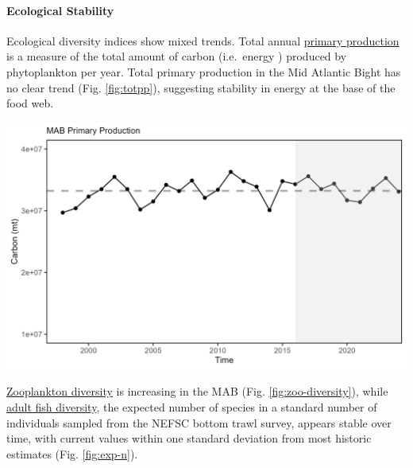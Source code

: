\documentclass[
  10pt,
]{article}
\let\origfigure\figure
\let\endorigfigure\endfigure
\renewenvironment{figure}[1][2] {
    \expandafter\origfigure\expandafter[H]
} {
    \endorigfigure
}
\begin{document}
\paragraph{Ecological Stability}\label{ecological-stability}

Ecological diversity indices show mixed trends. Total annual \href{https://noaa-edab.github.io/catalog/chl_pp.html}{primary production} is a measure of the total amount of carbon (i.e.~energy ) produced by phytoplankton per year. Total primary production in the Mid Atlantic Bight has no clear trend (Fig. \ref{fig:totpp}), suggesting stability in energy at the base of the food web.

\begin{figure}

{\centering \includegraphics[width=6.5in]{images/MidAtlantic/totpp_MidAtlantic_2025-09-05} 

}

\caption{Total areal annual primary production for the MAB. The dashed line represents the long-term (1998-2024) annual mean.}\label{fig:totpp}
\end{figure}

\href{https://noaa-edab.github.io/catalog/zoo_diversity.html}{Zooplankton diversity} is increasing in the MAB (Fig. \ref{fig:zoo-diversity}), while \href{https://noaa-edab.github.io/catalog/exp_n.html}{adult fish diversity}, the expected number of species in a standard number of individuals sampled from the NEFSC bottom trawl survey, appears stable over time, with current values within one standard deviation from most historic estimates (Fig. \ref{fig:exp-n}).
\end{document}
